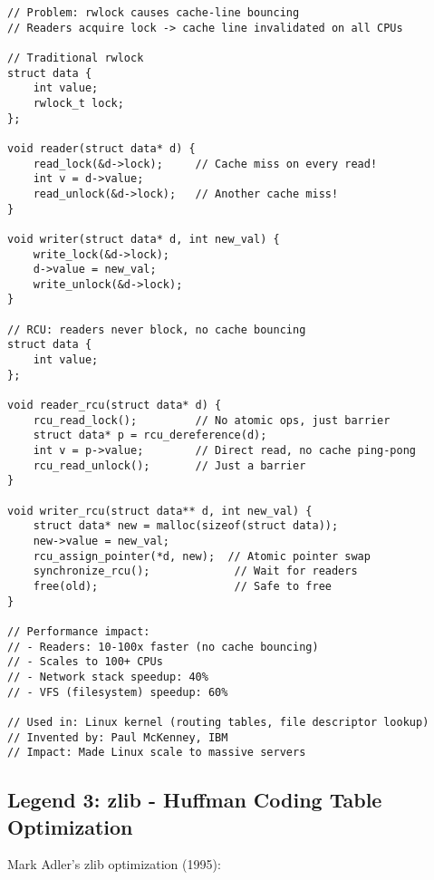 \begin{lstlisting}
// Problem: rwlock causes cache-line bouncing
// Readers acquire lock -> cache line invalidated on all CPUs

// Traditional rwlock
struct data {
    int value;
    rwlock_t lock;
};

void reader(struct data* d) {
    read_lock(&d->lock);     // Cache miss on every read!
    int v = d->value;
    read_unlock(&d->lock);   // Another cache miss!
}

void writer(struct data* d, int new_val) {
    write_lock(&d->lock);
    d->value = new_val;
    write_unlock(&d->lock);
}

// RCU: readers never block, no cache bouncing
struct data {
    int value;
};

void reader_rcu(struct data* d) {
    rcu_read_lock();         // No atomic ops, just barrier
    struct data* p = rcu_dereference(d);
    int v = p->value;        // Direct read, no cache ping-pong
    rcu_read_unlock();       // Just a barrier
}

void writer_rcu(struct data** d, int new_val) {
    struct data* new = malloc(sizeof(struct data));
    new->value = new_val;
    rcu_assign_pointer(*d, new);  // Atomic pointer swap
    synchronize_rcu();             // Wait for readers
    free(old);                     // Safe to free
}

// Performance impact:
// - Readers: 10-100x faster (no cache bouncing)
// - Scales to 100+ CPUs
// - Network stack speedup: 40%
// - VFS (filesystem) speedup: 60%

// Used in: Linux kernel (routing tables, file descriptor lookup)
// Invented by: Paul McKenney, IBM
// Impact: Made Linux scale to massive servers
\end{lstlisting}

\subsection{Legend 3: zlib - Huffman Coding Table Optimization}

Mark Adler's zlib optimization (1995):

